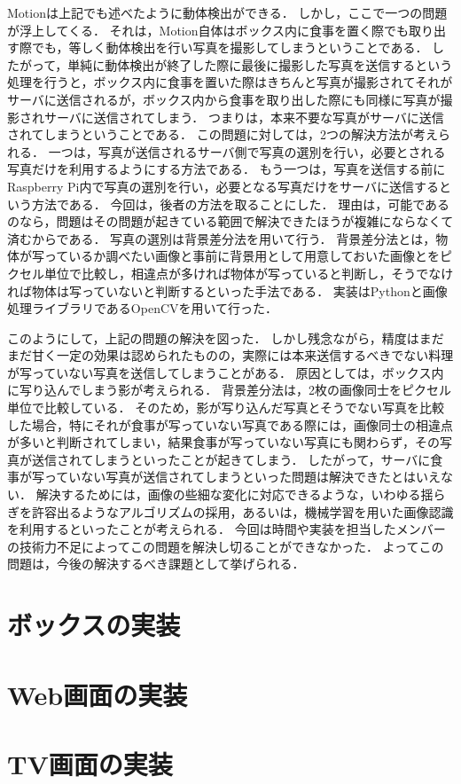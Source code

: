 \documentclass[../report]{subfiles}
\begin{document}
Motionは上記でも述べたように動体検出ができる．
しかし，ここで一つの問題が浮上してくる．
それは，Motion自体はボックス内に食事を置く際でも取り出す際でも，等しく動体検出を行い写真を撮影してしまうということである．
したがって，単純に動体検出が終了した際に最後に撮影した写真を送信するという処理を行うと，ボックス内に食事を置いた際はきちんと写真が撮影されてそれがサーバに送信されるが，ボックス内から食事を取り出した際にも同様に写真が撮影されサーバに送信されてしまう．
つまりは，本来不要な写真がサーバに送信されてしまうということである．
この問題に対しては，2つの解決方法が考えられる．
一つは，写真が送信されるサーバ側で写真の選別を行い，必要とされる写真だけを利用するようにする方法である．
もう一つは，写真を送信する前にRaspberry Pi内で写真の選別を行い，必要となる写真だけをサーバに送信するという方法である．
今回は，後者の方法を取ることにした．
理由は，可能であるのなら，問題はその問題が起きている範囲で解決できたほうが複雑にならなくて済むからである．
写真の選別は背景差分法を用いて行う．
背景差分法とは，物体が写っているか調べたい画像と事前に背景用として用意しておいた画像とをピクセル単位で比較し，相違点が多ければ物体が写っていると判断し，そうでなければ物体は写っていないと判断するといった手法である．
実装はPythonと画像処理ライブラリであるOpenCVを用いて行った．

このようにして，上記の問題の解決を図った．
しかし残念ながら，精度はまだまだ甘く一定の効果は認められたものの，実際には本来送信するべきでない料理が写っていない写真を送信してしまうことがある．
原因としては，ボックス内に写り込んでしまう影が考えられる．
背景差分法は，2枚の画像同士をピクセル単位で比較している．
そのため，影が写り込んだ写真とそうでない写真を比較した場合，特にそれが食事が写っていない写真である際には，画像同士の相違点が多いと判断されてしまい，結果食事が写っていない写真にも関わらず，その写真が送信されてしまうといったことが起きてしまう．
したがって，サーバに食事が写っていない写真が送信されてしまうといった問題は解決できたとはいえない．
解決するためには，画像の些細な変化に対応できるような，いわゆる揺らぎを許容出るようなアルゴリズムの採用，あるいは，機械学習を用いた画像認識を利用するといったことが考えられる．
今回は時間や実装を担当したメンバーの技術力不足によってこの問題を解決し切ることができなかった．
よってこの問題は，今後の解決するべき課題として挙げられる．


\section{ボックスの実装}


\section{Web画面の実装}


\section{TV画面の実装}
\end{document}
